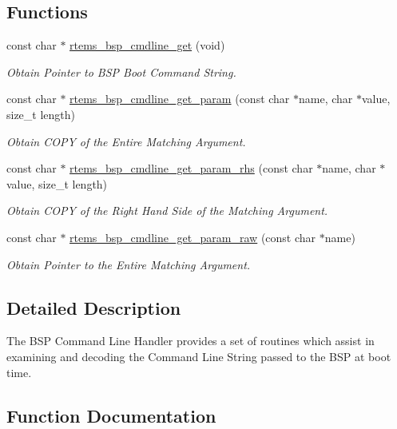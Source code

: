 \subsection*{Functions}
\begin{DoxyCompactItemize}
\item 
const char $\ast$ \mbox{\hyperlink{group__BSPCommandLine_ga6471bcde516df5d407041611984bbe87}{rtems\+\_\+bsp\+\_\+cmdline\+\_\+get}} (void)
\begin{DoxyCompactList}\small\item\em Obtain Pointer to B\+SP Boot Command String. \end{DoxyCompactList}\item 
const char $\ast$ \mbox{\hyperlink{group__BSPCommandLine_gad7c20e3e7204c22bbbf8fed563f70d44}{rtems\+\_\+bsp\+\_\+cmdline\+\_\+get\+\_\+param}} (const char $\ast$name, char $\ast$value, size\+\_\+t length)
\begin{DoxyCompactList}\small\item\em Obtain C\+O\+PY of the Entire Matching Argument. \end{DoxyCompactList}\item 
const char $\ast$ \mbox{\hyperlink{group__BSPCommandLine_ga0f3547afb380c3faef9165ae8e9f08cf}{rtems\+\_\+bsp\+\_\+cmdline\+\_\+get\+\_\+param\+\_\+rhs}} (const char $\ast$name, char $\ast$value, size\+\_\+t length)
\begin{DoxyCompactList}\small\item\em Obtain C\+O\+PY of the Right Hand Side of the Matching Argument. \end{DoxyCompactList}\item 
const char $\ast$ \mbox{\hyperlink{group__BSPCommandLine_gaccb3ff954c27dda66c8a9cd65a50cd54}{rtems\+\_\+bsp\+\_\+cmdline\+\_\+get\+\_\+param\+\_\+raw}} (const char $\ast$name)
\begin{DoxyCompactList}\small\item\em Obtain Pointer to the Entire Matching Argument. \end{DoxyCompactList}\end{DoxyCompactItemize}


\subsection{Detailed Description}
The B\+SP Command Line Handler provides a set of routines which assist in examining and decoding the Command Line String passed to the B\+SP at boot time. 

\subsection{Function Documentation}
\mbox{\label{group__BSPCommandLine_ga6471bcde516df5d407041611984bbe87}} 
